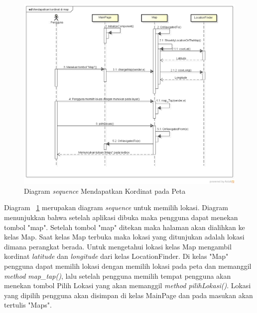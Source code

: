 \begin{figure}[h]
	\centering
		\includegraphics[scale=0.4]{Gambar/sequence/MendapatkanKordinatDiMap}
	\caption{Diagram \textit{sequence} Mendapatkan Kordinat pada Peta}
	\label{fig:sequence lokasi pada peta}
\end{figure}

\hspace{0.5cm} Diagram ~\ref{fig:sequence lokasi pada peta} merupakan diagram \textit{sequence} untuk memilih lokasi. Diagram menunjukkan bahwa setelah aplikasi dibuka maka pengguna dapat menekan tombol "map". Setelah tombol "map" ditekan maka halaman akan dialihkan ke kelas Map. Saat kelas Map terbuka maka lokasi yang ditunjukan adalah lokasi dimana perangkat berada. Untuk mengetahui lokasi kelas Map mengambil kordinat \textit{latitude} dan \textit{longitude} dari kelas LocationFinder. Di kelas "Map" pengguna dapat memilih lokasi dengan memilih lokasi pada peta dan memanggil \textit{method map\_tap()}, lalu setelah pengguna memilih tempat pengguna akan menekan tombol Pilih Lokasi yang akan memanggil \textit{method pilihLokasi()}. Lokasi yang dipilih pengguna akan disimpan di kelas MainPage dan pada masukan akan tertulis "Maps". 

